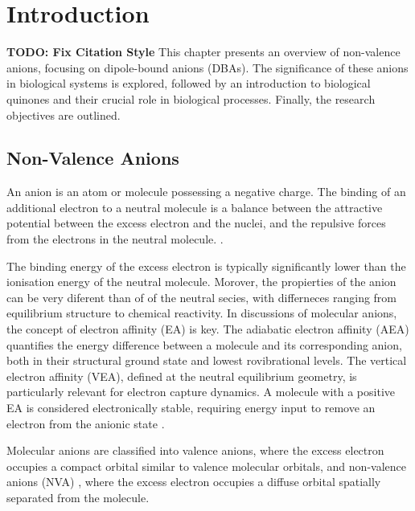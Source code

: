 \chapter{Introduction}\label{ch:introduction}
\textbf{TODO: Fix Citation Style}
This chapter presents an overview of non-valence anions, focusing on dipole-bound anions (DBAs). The significance of these anions in biological systems is explored, followed by an introduction to biological quinones and their crucial role in biological processes. Finally, the research objectives are outlined.

\section{Non-Valence Anions}
An anion is an atom or molecule possessing a negative charge. The binding of an additional electron to a neutral molecule is a balance between the attractive potential between the excess electron and the nuclei, and the repulsive forces from the electrons in the neutral molecule.  \cite{simons2008molecular, herbert2015quantum}.

The binding energy of the excess electron is typically significantly lower than the ionisation energy of the neutral molecule. Morover, the propierties of the anion can be very diferent than of of the neutral secies, with differneces ranging from equilibrium structure to chemical reactivity. In discussions of molecular anions, the concept of electron affinity (EA) is key. The adiabatic electron affinity (AEA) quantifies the energy difference between a molecule and its corresponding anion, both in their structural ground state and lowest rovibrational levels. The vertical electron affinity (VEA), defined at the neutral equilibrium geometry, is particularly relevant for electron capture dynamics. A molecule with a positive EA is considered electronically stable, requiring energy input to remove an electron from the anionic state \cite{simons2008molecular}.

Molecular anions are classified into valence anions, where the excess electron occupies a compact orbital similar to valence molecular orbitals, and non-valence anions (NVA) , where the excess electron occupies a diffuse orbital spatially separated from the molecule. 

